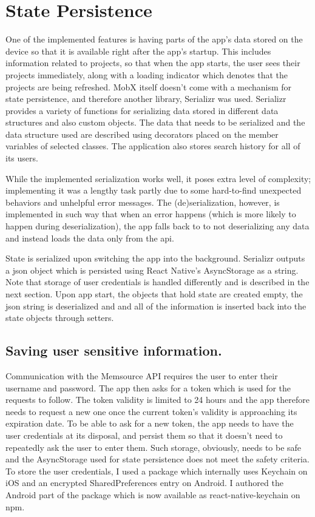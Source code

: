 \section{State Persistence}

One of the implemented features is having parts of the app's data stored on the device so that it is available right after the app’s startup. This includes information related to projects, so that when the app starts, the user sees their projects immediately, along with a loading indicator which denotes that the projects are being refreshed. MobX itself doesn't come with a mechanism for state persistence, and therefore another library, Serializr was used. Serializr provides a variety of functions for serializing data stored in different data structures and also custom objects. The data that needs to be serialized and the data structure used are described using decorators placed on the member variables of selected classes. The application also stores search history for all of its users. 

While the implemented serialization works well, it poses extra level of complexity; implementing it was a lengthy task partly due to some hard-to-find unexpected behaviors and unhelpful error messages. The (de)serialization, however, is implemented in such way that when an error happens (which is more likely to happen during deserialization), the app falls back to to not deserializing any data and instead loads the data only from the api.


State is serialized upon switching the app into the background. Serializr outputs a json object which is persisted using React Native’s AsyncStorage as a string. Note that storage of user credentials is handled differently and is described in the next section. Upon app start, the objects that hold state are created empty, the json string is deserialized and and all of the information is inserted back into the state objects through setters. 


\subsection{Saving user sensitive information.}

Communication with the Memsource API requires the user to enter their username and password. The app then asks for a token which is used for the requests to follow. The token validity is limited to 24 hours and the app therefore needs to request a new one once the current token's validity is approaching its expiration date. To be able to ask for a new token, the app needs to have the user credentials at its disposal, and persist them so that it doesn't need to repeatedly ask the user to enter them. Such storage, obviously, needs to be safe and the AsyncStorage used for state persistence does not meet the safety criteria. To store the user credentials, I used a package which internally uses Keychain on iOS and an encrypted SharedPreferences entry on Android. I authored the Android part of the package which is now available as react-native-keychain on npm. 

